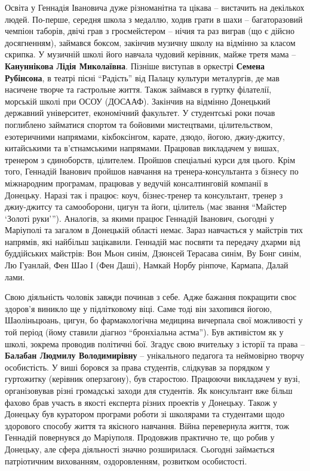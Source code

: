 Освіта у Геннадія Івановича дуже різноманітна та цікава – вистачить на
декількох людей. По-перше, середня школа з медаллю, ходив грати в шахи –
багаторазовий чемпіон таборів, двічі грав з гросмейстером – нічия та раз виграв
(що є дійсно досягненням), займався боксом, закінчив музичну школу на відмінно
за класом скрипка. У музичній школі його навчала чудовий керівник, майже третя
мама – \textbf{Кануннікова Лідія Миколаївна}. Пізніше виступав в оркестрі \textbf{Семена
Рубінсона}, в театрі пісні \enquote{Радість} від Палацу культури металургів, де мав
насичене творче та гастрольне життя. Також займався в гуртку філателії,
морській школі при ОСОУ (ДОСААФ). Закінчив на відмінно Донецький державний
університет, економічний факультет. У студентські роки почав поглиблено
займатися спортом та бойовими мистецтвами, цілительством, езотеричними
напрямами, кікбоксінгом, карате, дзюдо, йогою, джиу-джитсу, китайськими та
в’єтнамськими напрямами. Працював викладачем у вишах, тренером з єдиноборств,
цілителем. Пройшов спеціальні курси для цього. Крім того, Геннадій Іванович
пройшов навчання на тренера-консультанта з бізнесу по міжнародним програмам,
працював у ведучій консалтинговій компанії в Донецьку. Наразі так і працює:
коуч, бізнес-тренер та консультант, тренер з джиу-джитсу та самооборони, цигун
та йоги, цілитель (має звання \enquote{Майстер \enquote{Золоті руки}}). Аналогів, за якими
працює Геннадій Іванович, сьогодні у Маріуполі та загалом в Донецькій області
немає. Зараз навчається у майстрів тих напрямів, які найбільш зацікавили.
Геннадій має посвяти та передачу дхарми від буддійських майстрів: Вон Мьон
синім, Дзюнсей Терасава синім, Ву Бонг синім, Лю Гуанлай, Фен Шао І (Фен Даші),
Намкай Норбу рінпоче, Кармапа, Далай лами.

Свою діяльність чоловік завжди починав з себе. Адже бажання покращити своє
здоров'я виникло ще у підлітковому віці. Саме тоді він захопився йогою,
Шаоліньцюань, цигун, бо фармакологічна медицина вичерпала свої можливості у той
період (йому ставили діагноз \enquote{бронхіальна астма}). Був активістом як у школі,
зокрема проводив політичні бої. Згадує свою вчительку з історії та права –
\textbf{Балабан Людмилу Володимирівну} – унікального педагога та неймовірно творчу
особистість. У виші боровся за права студентів, слідкував за порядком у
гуртожитку (керівник оперзагону), був старостою. Працюючи викладачем у вузі,
організовував різні громадські заходи для студентів. Як консультант вже більш
фахово брав участь в якості експерта різних проектів у Донецьку. Також у
Донецьку був куратором програми роботи зі школярами та студентами щодо
здорового способу життя та якісного навчання. Війна перевернула життя, тож
Геннадій повернувся до Маріуполя. Продовжив практично те, що робив у Донецьку,
але сфера діяльності значно розширилася. Сьогодні займається патріотичним
вихованням, оздоровленням, розвитком особистості.

